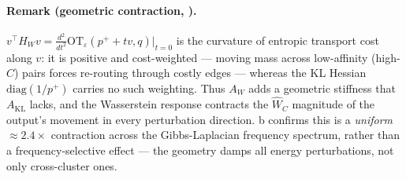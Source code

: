 \documentclass{article}
\theoremstyle{plain}
\newcommand{\mWdist}{\widehat{W}_C}
\begin{document}
\paragraph{Remark (geometric contraction, ).}
$v^\top H_W v = \tfrac{d^2}{dt^2}\mathrm{OT}_\varepsilon(p^++tv,q)\big|_{t=0}$ is the curvature of entropic transport cost along $v$: it is positive and cost-weighted --- moving mass across low-affinity (high-$C$) pairs forces re-routing through costly edges --- whereas the KL Hessian $\mathrm{diag}(1/p^+)$ carries no such weighting. Thus $A_W$ adds a geometric stiffness that $A_{\mathrm{KL}}$ lacks, and the Wasserstein response contracts the $\mWdist$ magnitude of the output's movement in every perturbation direction. b confirms this is a \emph{uniform} ${\approx}2.4\times$ contraction across the Gibbs-Laplacian frequency spectrum, rather than a frequency-selective effect --- the geometry damps all energy perturbations, not only cross-cluster ones.



\end{document}

